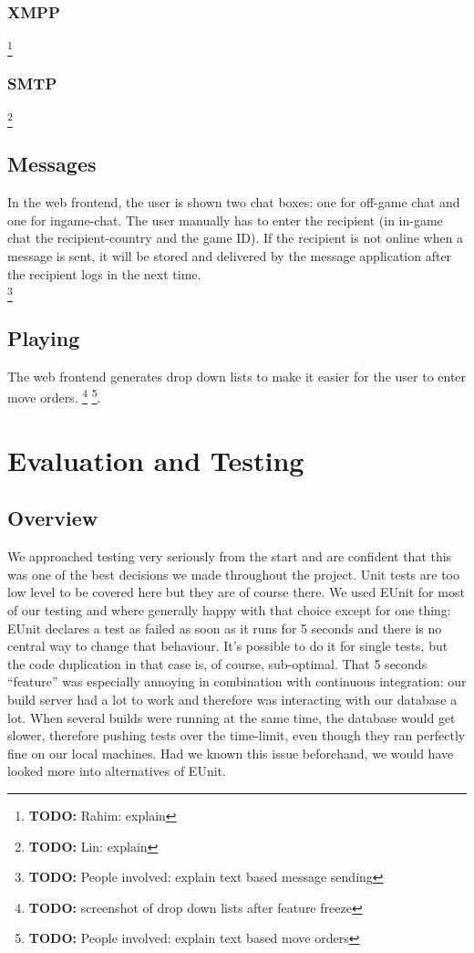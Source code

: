 \documentclass[11pt,a4paper]{report}
\newcommand{\hi}[1]{{\color{red}\em #1\/}\\}
\newcommand{\todo}[1]{\footnote{{\color{red} {\bf TODO:} #1}}}
\begin{document}
\subsection{XMPP}
\todo{Rahim: explain}
\subsection{SMTP}
\todo{Lin: explain}
\section{Messages}
In the web frontend, the user is shown two chat boxes: one for off-game chat
and one for ingame-chat. The user manually has to enter the recipient (in
in-game chat the recipient-country and the game ID). If the recipient is not
online when a message is sent, it will be stored and delivered by the message
application after the recipient logs in the next time. \\
\todo{People involved: explain text based message sending}

\section{Playing}
The web frontend generates drop down lists to make it easier for the user to
enter move orders. \todo{screenshot of drop down lists after feature freeze}
\todo{People involved: explain text based move orders}.

\chapter{Evaluation and Testing}
\section{Overview}
We approached testing very seriously from the start and are confident that this
was one of the best decisions we made throughout the project. Unit tests are too
low level to be covered here but they are of course there. We used EUnit for
most of our testing and where generally happy with that choice except for one
thing: EUnit declares a test as failed as soon as it runs for 5 seconds and
there is no central way to change that behaviour. It's possible to do it for
single tests, but the code duplication in that case is, of course, sub-optimal.
That 5 seconds ``feature'' was especially annoying in combination with
continuous integration: our build server had a lot to work and therefore was
interacting with our database a lot. When several builds were running at the
same time, the database would get slower, therefore pushing tests over the
time-limit, even though they ran perfectly fine on our local machines. Had we
known this issue beforehand, we would have looked more into alternatives of
EUnit.
\end{document}
